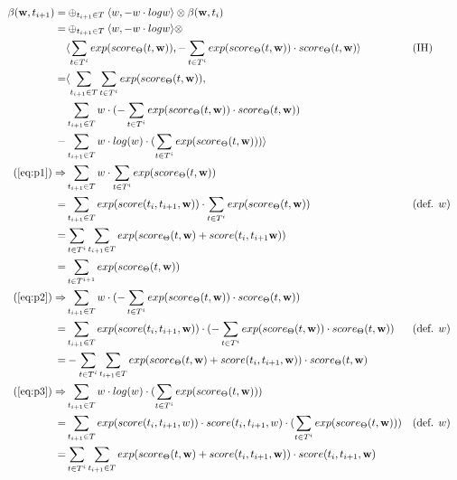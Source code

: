 \documentclass[a4paper,12pt]{ETHexercise}
\begin{document}
\begin{align}
    \beta(\textbf{w}, t_{i+1}) = &\oplus_{t_{i+1} \in T} \langle w, -w \cdot logw\rangle \otimes \beta(\textbf{w}, t_i)\\
    = &\oplus_{t_{i+1} \in T} \langle w, -w \cdot logw\rangle \otimes \\ 
    &\langle\sum_{t \in T^i} exp(score_\Theta(t,\textbf{w})), -\sum_{t \in T^i} exp(score_\Theta(t,\textbf{w})) \cdot score_\Theta(t,\textbf{w})\rangle &&(\text{IH})\\
    = &\langle  \sum_{t_{i+1}\in T}\sum_{t \in T^i} exp(score_\Theta(t,\textbf{w}))  , \label{eq:p1}\\ 
    &\sum_{t_{i+1}\in T} w \cdot (-\sum_{t \in T^i} exp(score_\Theta(t,\textbf{w})) \cdot score_\Theta(t,\textbf{w})) \label{eq:p2}\\
    -&\sum_{t_{i+1}\in T} w \cdot log(w) \cdot (\sum_{t \in T^i} exp(score_\Theta(t,\textbf{w}))) \rangle \label{eq:p3}\\
    (\ref{eq:p1}) \Rightarrow &\sum_{t_{i+1}\in T} w \cdot \sum_{t \in T^i} exp(score_\Theta(t,\textbf{w}))\\
    = &\sum_{t_{i+1}\in T} exp(score(t_{i}, t_{i+1}, \textbf{w})) \cdot \sum_{t \in T^i} exp(score_\Theta(t,\textbf{w})) &&(\text{def. }w) \\
    = &\sum_{t \in T^i} \sum_{t_{i+1}\in T} exp(score_\Theta(t,\textbf{w}) + score(t_{i}, t_{i+1} \textbf{w}))\\
    = &\sum_{t \in T^{i+1}} exp(score_\Theta(t,\textbf{w})) \label{eq:p1r}\\
    (\ref{eq:p2}) \Rightarrow & \sum_{t_{i+1}\in T} w \cdot (-\sum_{t \in T^i} exp(score_\Theta(t,\textbf{w})) \cdot score_\Theta(t,\textbf{w}))\\
    = &\sum_{t_{i+1}\in T} exp(score(t_{i}, t_{i+1}, \textbf{w})) \cdot (-\sum_{t \in T^i} exp(score_\Theta(t,\textbf{w})) \cdot score_\Theta(t,\textbf{w})) &&(\text{def. }w)\\
    = &-\sum_{t \in T^i}\sum_{t_{i+1}\in T} exp(score_\Theta(t,\textbf{w}) + score(t_{i}, t_{i+1}, \textbf{w})) \cdot score_\Theta(t,\textbf{w}) \label{eq:p2r}\\
    (\ref{eq:p3}) \Rightarrow &\sum_{t_{i+1}\in T} w \cdot log(w) \cdot (\sum_{t \in T^i} exp(score_\Theta(t,\textbf{w})))\\
    = &\sum_{t_{i+1}\in T} exp(score(t_{i}, t_{i+1}, w)) \cdot score(t_{i}, t_{i+1},w) \cdot (\sum_{t \in T^i} exp(score_\Theta(t,\textbf{w}))) &&(\text{def. }w)\\
    = &\sum_{t \in T^i} \sum_{t_{i+1}\in T} exp(score_\Theta(t,\textbf{w}) + score(t_{i}, t_{i+1}, \textbf{w})) \cdot score(t_{i}, t_{i+1}, \textbf{w}) \label{eq:p3r}
\end{align}
\end{document}
